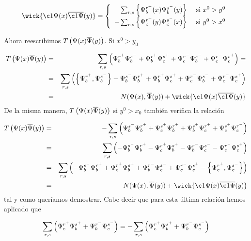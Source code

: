 \begin{solucion}
	\begin{equation*}
		\wick{\c1{\Psi}(x)\overline{\c1{\Psi}}(y)} =\left\lbrace  \begin{array}{rl}
			\sum_{r,s} \left\lbrace \Psi_b^{r^+} (x) \Psi_b^{s^-} (y) \right\rbrace  & \ \text{si} \ x^0>y^0 \\
			- \sum_{r,s} \left\lbrace \Psi_c^{r^+} (y) \Psi_c^{s^-} (x) \right\rbrace  & \ \text{si} \ y^0>x^0 \\
		\end{array} \right.
	\end{equation*}
	
	Ahora reescribimos $ T \left(  \Psi(x) \overline{\Psi}(y)  \right)$. Si $x^0 > y_0$
	
	\begin{eqnarray*}
		  T \parentesis{ \Psi(x) \aPsi(y) } & = &  \sum_{r,s} \parentesis{ \Psi_b^{r^+} \Psi_b^{s^-} +  \Psi_b^{r^+}\Psi_c^{s^+} + \Psi_c^{r^-} \Psi_b^{s^-} + \Psi_c^{r^-}\Psi_c^{s^+}} = \\
		  &=&\sum_{r,s} \parentesis{ \left\lbrace  \Psi_b^{r^+}, \Psi_b^{s^-} \right\rbrace - \Psi_b^{s^-}  \Psi_b^{r^+}  +  \Psi_b^{r^+}\Psi_c^{s^+} + \Psi_c^{r^-} \Psi_b^{s^-} + \Psi_c^{r^-}\Psi_c^{s^+} } \\
		  &=& N(\Psi (x),\aPsi(y))+\wick{\c1{\Psi}(x)\overline{\c1{\Psi}}(y)}   
	\end{eqnarray*}	
	De la misma manera, $ T \left(  \Psi(x) \overline{\Psi}(y)  \right)$ si $y^0 > x_0$ también verifica la relación
	
	\begin{eqnarray*}
		T \parentesis{ \Psi(x) \aPsi(y) } & = & -  \sum_{r,s} \parentesis{ \Psi_b^{s^-} \Psi_b^{r^+} +  \Psi_c^{s^+}\Psi_b^{r^+} + \Psi_b^{s^+} \Psi_c^{r^+} + \Psi_c^{s^+}\Psi_c^{r^-}} \\
		&=&\sum_{r,s} \parentesis{ - \Psi_b^{s^-} \Psi_b^{r^+}  -	\Psi_c^{r^+}\Psi_b^{s^+} - \Psi_b^{r^-} \Psi_c^{s^-} - \Psi_c^{r^-}\Psi_c^{s^+}}\\
		&=&\sum_{r,s} \parentesis{ - \Psi_b^{s^-} \Psi_b^{r^+}  +  	\Psi_c^{r^+}\Psi_b^{s^+} + \Psi_b^{r^-} \Psi_c^{s^-} + \Psi_c^{r^-}\Psi_c^{s^+} - \left\lbrace  \Psi_c^{r^+}, \Psi_c^{s^-} \right\rbrace } \\
		&=& N(\Psi (x),\aPsi(y))+\wick{\c1{\Psi}(x)\overline{\c1{\Psi}}(y)}   
	\end{eqnarray*}
	tal y como queríamos demostrar. Cabe decir que para esta última relación hemos aplicado que
	
	\begin{equation*}
		\sum_{r,s} \left( \Psi_c^{r^+}\Psi_b^{s^+} + \Psi_b^{r^-} \Psi_c^{s^-} \right) = - \sum_{r,s} \left(  \Psi_c^{r^+}\Psi_b^{s^+} + \Psi_b^{r^-} \Psi_c^{s^-} \right)
	\end{equation*}
	
\end{solucion}


